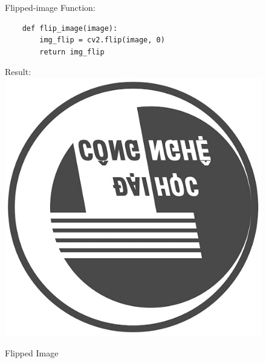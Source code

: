 \documentclass{article}
\begin{document}
\begin{figure}[htbp]
Flipped-image Function:
    \begin{verbatim}
    def flip_image(image):
        img_flip = cv2.flip(image, 0)
        return img_flip
    \end{verbatim}
Result:
  \centering
  \includegraphics[width=\linewidth]{lena_gray_flipped.jpg}
  \caption{Flipped Image}
  \label{fig:my_image}
\end{figure}

\printbibliography
\end{document}
